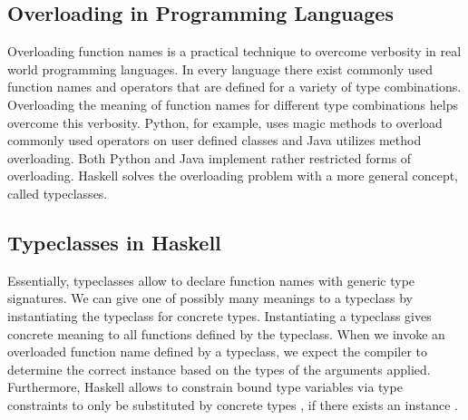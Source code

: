 \subsection{Overloading in Programming Languages}
Overloading function names is a practical technique to overcome verbosity in real world programming languages. 
In every language there exist commonly used function names and operators that are defined for a variety of type combinations.
Overloading the meaning of function names for different type combinations helps overcome this verbosity.
Python, for example, uses magic methods to overload commonly used operators on user defined classes and Java utilizes method overloading. Both Python and Java implement rather restricted forms of overloading. Haskell solves the overloading problem with a more general concept, called typeclasses.

\subsection{Typeclasses in Haskell}
Essentially, typeclasses allow to declare function names with generic type signatures.
We can give one of possibly many meanings to a typeclass by instantiating the typeclass for concrete types. 
Instantiating a typeclass gives concrete meaning to all functions defined by the typeclass.
When we invoke an overloaded function name defined by a typeclass, we expect the compiler to determine the correct instance based on the types of the arguments applied. 
Furthermore, Haskell allows to constrain bound type variables  via type constraints  to only be substituted by concrete types , if there exists an instance  .

